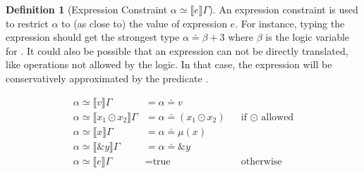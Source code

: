 \documentclass[twoside, english]{sdqthesis}
\newcommand{\bbracket}[1]{\llbracket #1 \rrbracket}
\theoremstyle{definition}
\newtheorem{definition}[theorem]{Definition}
\begin{document}
\begin{definition}[Expression Constraint $\alpha \simeq \bbracket{e}\Gamma$]
An expression constraint is used to restrict $\alpha$ to (as close to) the value of expression $e$. For instance, typing the expression  should get the strongest type $\alpha \doteq \beta + 3$ where $\beta$ is the logic variable for .
It could also be possible that an expression can not be directly translated, like operations not allowed by the logic. In that case, the expression will be conservatively approximated by the predicate .

\begin{align*}
  \alpha \simeq \bbracket{v}\Gamma &= \alpha \doteq v
  \\ \alpha \simeq \bbracket{x_1 \odot x_2}\Gamma &= \alpha \doteq (x_1 \odot x_2) &&\text{if }\odot\text{ allowed}
  \\ \alpha \simeq \bbracket{x}\Gamma &= \alpha \doteq \mu(x)
  \\ \alpha \simeq \bbracket{\&y}\Gamma &= \alpha \doteq \&y
  \\ \alpha \simeq \bbracket{e}\Gamma &= \text{true} &&\text{otherwise}
\end{align*}
\end{definition}
\end{document}
